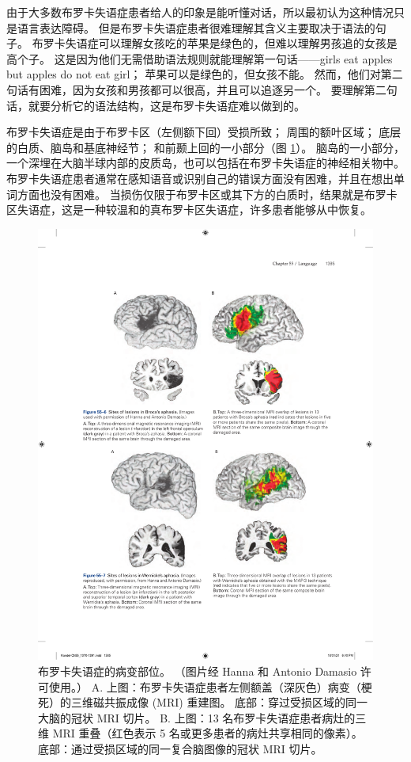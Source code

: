 由于大多数布罗卡失语症患者给人的印象是能听懂对话，所以最初认为这种情况只是语言表达障碍。 但是布罗卡失语症患者很难理解其含义主要取决于语法的句子。 布罗卡失语症可以理解女孩吃的苹果是绿色的，但难以理解男孩追的女孩是高个子。 这是因为他们无需借助语法规则就能理解第一句话——girls eat apples but apples do not eat girl； 苹果可以是绿色的，但女孩不能。 然而，他们对第二句话有困难，因为女孩和男孩都可以很高，并且可以追逐另一个。 要理解第二句话，就要分析它的语法结构，这是布罗卡失语症难以做到的。

布罗卡失语症是由于布罗卡区（左侧额下回）受损所致； 周围的额叶区域； 底层的白质、脑岛和基底神经节； 和前颞上回的一小部分（图 \ref{fig:55_6}）。 脑岛的一小部分，一个深埋在大脑半球内部的皮质岛，也可以包括在布罗卡失语症的神经相关物中。 布罗卡失语症患者通常在感知语音或识别自己的错误方面没有困难，并且在想出单词方面也没有困难。 当损伤仅限于布罗卡区或其下方的白质时，结果就是布罗卡区失语症，这是一种较温和的真布罗卡区失语症，许多患者能够从中恢复。

\begin{figure}[htbp]
	\centering
	\includegraphics[width=0.7\linewidth]{chap55/fig_55_6}
	\caption{布罗卡失语症的病变部位。 （图片经 Hanna 和 Antonio Damasio 许可使用。） A. 上图：布罗卡失语症患者左侧额盖（深灰色）病变（梗死）的三维磁共振成像 (MRI) 重建图。 底部：穿过受损区域的同一大脑的冠状 MRI 切片。 B. 上图：13 名布罗卡失语症患者病灶的三维 MRI 重叠（红色表示 5 名或更多患者的病灶共享相同的像素）。 底部：通过受损区域的同一复合脑图像的冠状 MRI 切片。}
	\label{fig:55_6}
\end{figure}

